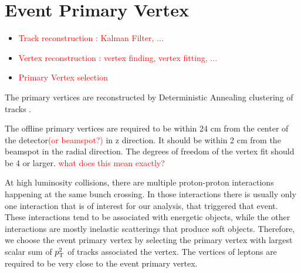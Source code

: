 %

\section{ Event Primary Vertex }
\begin{itemize}
\item \textcolor{red}{Track reconstruction : Kalman Filter, ...}
\item \textcolor{red}{Vertex reconstruction : vertex finding, vertex fitting, ...}
\item \textcolor{red}{Primary Vertex selection}
\end{itemize}

The primary vertices are reconstructed by Deterministic Annealing clustering of 
tracks \cite{davertex}.

The offline primary vertices are required to be within 24 cm from the center of the 
detector\textcolor{red}{(or beamspot?)} in z direction. 
It should be within 2 cm from the beamspot in the radial direction. 
The degrees of freedom of the vertex fit should be 4 or larger. 
\textcolor{red}{what does this mean exactly?} 

At high luminosity collisions, there are multiple proton-proton interactions 
happening at the same bunch crossing. In those interactions there is usually 
only one interaction that is of interest for our analysis, that triggered that event. 
These interactions tend to be associated with energetic objects, 
while the other interactions are mostly inelastic scatterings that produce soft objects.
Therefore, we choose the event primary vertex by selecting the primary vertex 
with largest scalar sum of $p_\mathrm{T}^2$ of tracks associated the vertex. 
The vertices of leptons are required to be very close to the event primary vertex.  



